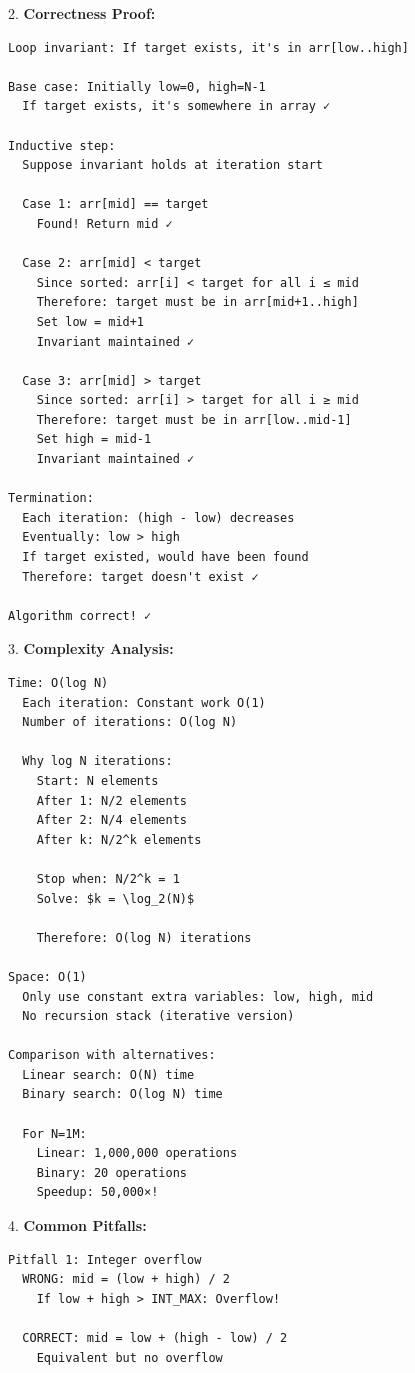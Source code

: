 \documentclass[11pt,a4paper,oneside]{book}
\begin{document}
\begin{tcolorbox}[
    enhanced,breakable,
    colback=white,
    colframe=deepblue,
    boxrule=1.5pt,
    arc=3mm,
    title=\textbf{The Divide and Conquer Paradigm}
]
2. \textbf{Correctness Proof:}
\begin{verbatim}
Loop invariant: If target exists, it's in arr[low..high]

Base case: Initially low=0, high=N-1
  If target exists, it's somewhere in array ✓

Inductive step:
  Suppose invariant holds at iteration start
  
  Case 1: arr[mid] == target
    Found! Return mid ✓
  
  Case 2: arr[mid] < target
    Since sorted: arr[i] < target for all i ≤ mid
    Therefore: target must be in arr[mid+1..high]
    Set low = mid+1
    Invariant maintained ✓
  
  Case 3: arr[mid] > target
    Since sorted: arr[i] > target for all i ≥ mid
    Therefore: target must be in arr[low..mid-1]
    Set high = mid-1
    Invariant maintained ✓

Termination:
  Each iteration: (high - low) decreases
  Eventually: low > high
  If target existed, would have been found
  Therefore: target doesn't exist ✓

Algorithm correct! ✓
\end{verbatim}

3. \textbf{Complexity Analysis:}
\begin{verbatim}
Time: O(log N)
  Each iteration: Constant work O(1)
  Number of iterations: O(log N)
  
  Why log N iterations:
    Start: N elements
    After 1: N/2 elements
    After 2: N/4 elements
    After k: N/2^k elements
    
    Stop when: N/2^k = 1
    Solve: $k = \log_2(N)$
    
    Therefore: O(log N) iterations

Space: O(1)
  Only use constant extra variables: low, high, mid
  No recursion stack (iterative version)

Comparison with alternatives:
  Linear search: O(N) time
  Binary search: O(log N) time
  
  For N=1M:
    Linear: 1,000,000 operations
    Binary: 20 operations
    Speedup: 50,000×!
\end{verbatim}

4. \textbf{Common Pitfalls:}
\begin{verbatim}
Pitfall 1: Integer overflow
  WRONG: mid = (low + high) / 2
    If low + high > INT_MAX: Overflow!
  
  CORRECT: mid = low + (high - low) / 2
    Equivalent but no overflow


\end{verbatim}
\end{tcolorbox}
\end{document}
